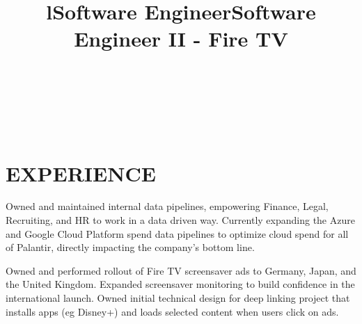 \documentclass[margin]{res}
\begin{document}
\begin{resume}

\begin{format}
\title{l}\\
\\
\body\\
\end{format}

\section{EXPERIENCE}

\title{\textbf{Software Engineer}}
\begin{position}
Owned and maintained internal data pipelines, empowering Finance, Legal, Recruiting, and HR to work in a data driven way. Currently expanding the Azure and Google Cloud Platform spend data pipelines to optimize cloud spend for all of Palantir, directly impacting the company's bottom line. 
\end{position}

\title{\textbf{Software Engineer II - Fire TV}}
\begin{position}
Owned and performed rollout of Fire TV screensaver ads to Germany, Japan, and the United Kingdom. Expanded screensaver monitoring to build confidence in the international launch. Owned initial technical design for deep linking project that installs apps (eg Disney+) and loads selected content when users click on ads. 
\end{position}


\end{resume}
\end{document}
